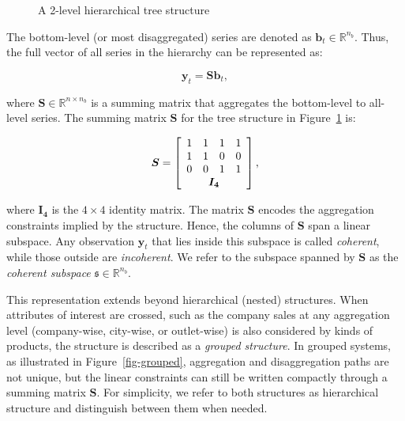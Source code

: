 \documentclass[
  11pt,
  letterpaper,
  DIV=11,
  numbers=noendperiod,
  titlepage]{scrartcl}
\begin{document}
\begin{figure}


\caption{\label{fig-hierarchy}A 2-level hierarchical tree structure}

\end{figure}%

The bottom-level (or most disaggregated) series are denoted as
\(\boldsymbol{b}_t \in \mathbb{R}^{n_b}\). Thus, the full vector of all
series in the hierarchy can be represented as:

\[
\boldsymbol{y}_t = \boldsymbol{S} \boldsymbol{b}_t,
\]

where \(\boldsymbol{S} \in \mathbb{R}^{n \times n_b}\) is a summing
matrix that aggregates the bottom-level to all-level series. The summing
matrix \(\boldsymbol{S}\) for the tree structure in
Figure~\ref{fig-hierarchy} is:

\[
\boldsymbol{S} = 
\left[
\begin{array}{cccc}
1 & 1 & 1 & 1 \\
1 & 1 & 0 & 0 \\
0 & 0 & 1 & 1 \\
\multicolumn{4}{c}{\boldsymbol{I_4}}
\end{array}
\right],
\]

where \(\boldsymbol{I_4}\) is the \(4 \times 4\) identity matrix. The
matrix \(\boldsymbol{S}\) encodes the aggregation constraints implied by
the structure. Hence, the columns of \(\boldsymbol{S}\) span a linear
subspace. Any observation \(\boldsymbol{y}_t\) that lies inside this
subspace is called \emph{coherent}, while those outside are
\emph{incoherent}. We refer to the subspace spanned by
\(\boldsymbol{S}\) as the \emph{coherent subspace}
\(\mathfrak{s} \in \mathbb{R}^{n_b}\).

This representation extends beyond hierarchical (nested) structures.
When attributes of interest are crossed, such as the company sales at
any aggregation level (company-wise, city-wise, or outlet-wise) is also
considered by kinds of products, the structure is described as a
\emph{grouped structure}. In grouped systems, as illustrated in
Figure~\ref{fig-grouped}, aggregation and disaggregation paths are not
unique, but the linear constraints can still be written compactly
through a summing matrix \(\boldsymbol{S}\). For simplicity, we refer to
both structures as hierarchical structure and distinguish between them
when needed.
\end{document}
